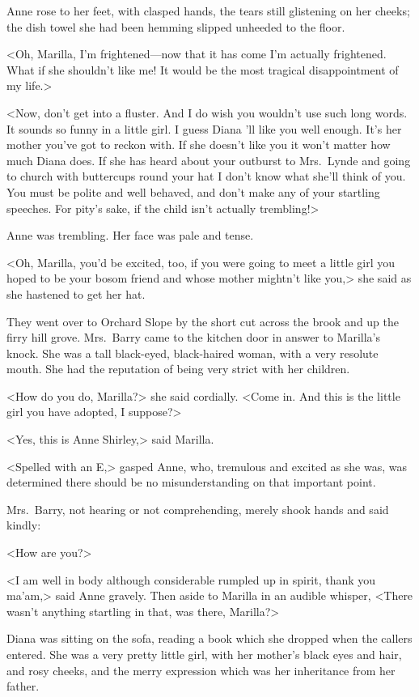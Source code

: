 Anne rose to her feet, with clasped hands, the tears still glistening on her cheeks; the dish towel she had been hemming slipped unheeded to the floor.

<Oh, Marilla, I'm frightened—now that it has come I'm actually frightened. What if she shouldn't like me! It would be the most tragical disappointment of my life.>

<Now, don't get into a fluster. And I do wish you wouldn't use such long words. It sounds so funny in a little girl. I guess Diana 'll like you well enough. It's her mother you've got to reckon with. If she doesn't like you it won't matter how much Diana does. If she has heard about your outburst to Mrs.~Lynde and going to church with buttercups round your hat I don't know what she'll think of you. You must be polite and well behaved, and don't make any of your startling speeches. For pity's sake, if the child isn't actually trembling!>

Anne was trembling. Her face was pale and tense.

<Oh, Marilla, you'd be excited, too, if you were going to meet a little girl you hoped to be your bosom friend and whose mother mightn't like you,> she said as she hastened to get her hat.

They went over to Orchard Slope by the short cut across the brook and up the firry hill grove. Mrs.~Barry came to the kitchen door in answer to Marilla's knock. She was a tall black-eyed, black-haired woman, with a very resolute mouth. She had the reputation of being very strict with her children.

<How do you do, Marilla?> she said cordially. <Come in. And this is the little girl you have adopted, I suppose?>

<Yes, this is Anne Shirley,> said Marilla.

<Spelled with an E,> gasped Anne, who, tremulous and excited as she was, was determined there should be no misunderstanding on that important point.

Mrs.~Barry, not hearing or not comprehending, merely shook hands and said kindly:

<How are you?>

<I am well in body although considerable rumpled up in spirit, thank you ma'am,> said Anne gravely. Then aside to Marilla in an audible whisper, <There wasn't anything startling in that, was there, Marilla?>

Diana was sitting on the sofa, reading a book which she dropped when the callers entered. She was a very pretty little girl, with her mother's black eyes and hair, and rosy cheeks, and the merry expression which was her inheritance from her father.

